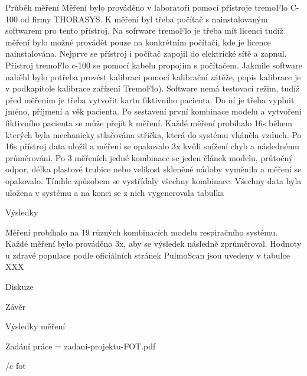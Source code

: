 \sec Průběh měření
Měření bylo prováděno v laboratoři pomocí přístroje tremoFlo C-100 od firmy THORASYS. K měření byl třeba počítač s nainstalovaným softwarem pro tento přístroj. Na sofrware tremoFlo je třeba mít licenci tudíž měření bylo možné provádět pouze na konkrétním počítači, kde je licence nainstalována.  Nejprve se přístroj i počítač zapojil do elektrické sítě a zapnul. Přístroj tremoFlo c-100 se pomocí kabelu propojim s počítačem. Jakmile software naběhl bylo potřeba provést kalibraci pomocí kalibrační zátěže, popis kalibrace je v podkapitole kalibrace zařízení TremoFlo). Software nemá testovací režim, tudíž před měřením je třeba vytvořit kartu fiktivního pacienta. Do ní je třeba vyplnit  jméno, příjmení a věk pacienta. Po sestavení první kombinace modelu a vytvoření fiktivního pacienta se může přejít k měření. Každé měření probíhalo 16s během kterých byla mechanicky stlačována střička, která do systému vháněla vzduch. Po 16s přístroj data uložil a měření se opakovalo 3x kvůli snížení chyb a následnému průměrování. Po 3 měřeních jedné kombinace se jeden článek modelu, průtočný odpor, délka plastové trubice nebo velikost skleněné nádoby vyměnila a měření se opakovalo. Tímhle způsobem se vystřídaly všechny kombinace. Všechny data byla uložena v systému a na konci se z nich vygenerovala tabulka


\chap Výsledky


Měření probíhalo na 19 různých kombinacích modelu respiračního systému. Každé měření bylo prováděno 3x, aby se výsledek následně zprůměroval. 
Hodnoty u zdravé populace podle oficiálních stránek PulmoScan jsou uvedeny v tabulce XXX


\chap Diskuze



\chap Závěr

\app Výsledky měření


\app Zadání práce
\picw=\hsize %
\cinspic zadani-projektu-FOT.pdf


\bibchap
\usebbl/c fot


\bye
